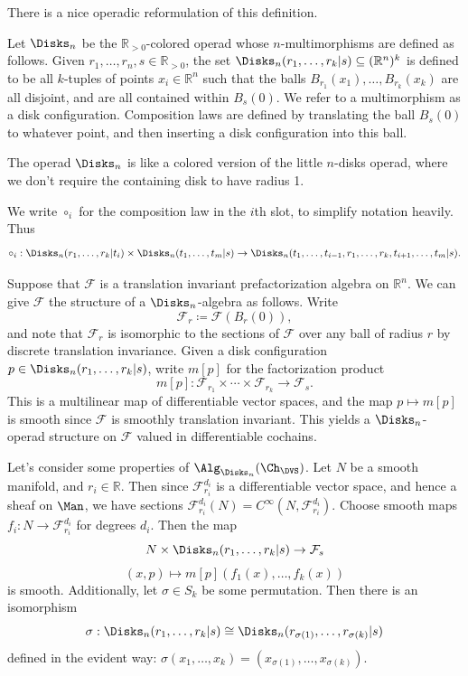 There is a nice operadic reformulation of this definition.

\begin{definition}\label{dfn:disksn}
	Let $\Disks_n$ be the $\mathbb{R} _{>0} $-colored operad whose $n$-multimorphisms are defined as follows. Given $r_1, \ldots , r_n,s\in\mathbb{R}_{>0} $, the set $\Disks_n(r_1, \ldots , r_k | s) \subseteq (\mathbb{R} ^n)^k$ is defined to be all $k$-tuples of points $x_i\in\mathbb{R} ^n$ such that the balls $B_{r_1} (x_1), \ldots , B_{r_k} (x_k)$ are all disjoint, and are all contained within $B_s(0)$. We refer to a multimorphism as a disk configuration. Composition laws are defined by translating the ball $B_s(0)$ to whatever point, and then inserting a disk configuration into this ball.
\end{definition}

\begin{remark}
	The operad $\Disks_n$ is like a colored version of the little $n$-disks operad, where we don't require the containing disk to have radius 1.
\end{remark}


We write $\circ _i$ for the composition law in the $i$th slot, to simplify notation heavily. Thus
\[
	\circ _i : \Disks_n(r_1, \ldots , r_k | t_i) \times \Disks_n(t_1, \ldots , t_m | s) \to \Disks_n(t_1, \ldots , t_{i-1} ,r_1, \ldots , r_k, t_{i+1} , \ldots , t_m | s)
.\]

Suppose that $\mathcal{F} $ is a translation invariant prefactorization algebra on $\mathbb{R} ^n$. We can give $\mathcal{F} $ the structure of a $\Disks_n$-algebra as follows. Write
\[
	\mathcal{F} _r \coloneqq \mathcal{F} (B_r(0)),
\]
and note that $\mathcal{F} _r$ is isomorphic to the sections of $\mathcal{F} $ over any ball of radius $r$ by discrete translation invariance. Given a disk configuration $p\in\Disks_n(r_1, \ldots , r_k | s)$, write $m[p]$ for the factorization product
\[
	m[p]: \mathcal{F} _{r_1} \times \cdots \times \mathcal{F} _{r_k}  \to \mathcal{F} _s
.\]
This is a multilinear map of differentiable vector spaces, and the map $p\mapsto m[p]$ is smooth since $\mathcal{F} $ is smoothly translation invariant. This yields a $\Disks_n$-operad structure on $\mathcal{F} $ valued in differentiable cochains.

Let's consider some properties of $\Alg_{\Disks_n} (\Ch_{\DVS } )$. Let $N$ be a smooth manifold, and $r_i\in\mathbb{R} $. Then since $\mathcal{F} _{r_i} ^{d_i} $ is a differentiable vector space, and hence a sheaf on $\Man $, we have sections $\mathcal{F} _{r_i} ^{d_i} (N) = C^\infty (N,\mathcal{F} _{r_i} ^{d_i} )$. Choose smooth maps $f_i : N\to \mathcal{F} _{r_i} ^{d_i}$ for degrees $d_i$. Then the map
\[
	N\times \Disks_n(r_1, \ldots , r_k | s) \to \mathcal{F} _s
\]
\[
	(x,p) \mapsto m[p](f_1(x), \ldots , f_k(x))
\]
is smooth. Additionally, let $\sigma \in S_k$ be some permutation. Then there is an isomorphism
\[
	\sigma : \Disks_n(r_1, \ldots , r_k | s) \cong \Disks_n(r_{\sigma (1)} , \ldots , r_{\sigma (k)} | s)
\]
defined in the evident way: $\sigma (x_1, \ldots , x_k) = (x_{\sigma (1)} , \ldots , x_{\sigma (k)} )$. 

